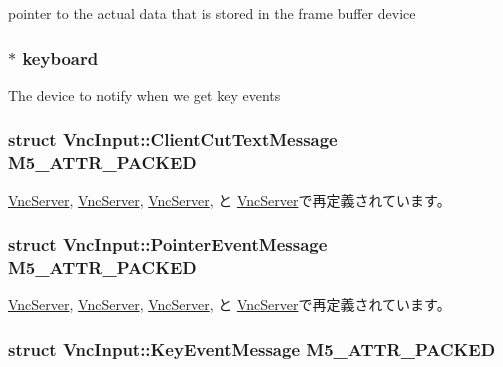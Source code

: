 pointer to the actual data that is stored in the frame buffer device \hypertarget{classVncInput_a185f1d765c763c2a2aae6b2b652a9032}{
\subsubsection[{keyboard}]{$\ast$ {\bf keyboard}}}
\label{classVncInput_a185f1d765c763c2a2aae6b2b652a9032}
The device to notify when we get key events \hypertarget{classVncInput_a7c02cfd94c82d02abac5f31f753a2865}{
\subsubsection[{M5\_\-ATTR\_\-PACKED}]{\setlength{\rightskip}{0pt plus 5cm}struct {\bf VncInput::ClientCutTextMessage}  {\bf M5\_\-ATTR\_\-PACKED}}}
\label{classVncInput_a7c02cfd94c82d02abac5f31f753a2865}


\hyperlink{group__VncConstants_ga2f0a8a1f1c40593e1e01ce4b8087d792}{VncServer}, \hyperlink{group__VncConstants_ga357314e013d6289c7d085fadd56a290c}{VncServer}, \hyperlink{group__VncConstants_gab34a91a8552f4b2f7e2806b835f39780}{VncServer}, と \hyperlink{group__VncConstants_gac782a3823c0bb07395a234047394d59e}{VncServer}で再定義されています。\hypertarget{classVncInput_aa0547849b66438129f69b5e83e4c5d01}{
\subsubsection[{M5\_\-ATTR\_\-PACKED}]{\setlength{\rightskip}{0pt plus 5cm}struct {\bf VncInput::PointerEventMessage}  {\bf M5\_\-ATTR\_\-PACKED}}}
\label{classVncInput_aa0547849b66438129f69b5e83e4c5d01}


\hyperlink{group__VncConstants_ga2f0a8a1f1c40593e1e01ce4b8087d792}{VncServer}, \hyperlink{group__VncConstants_ga357314e013d6289c7d085fadd56a290c}{VncServer}, \hyperlink{group__VncConstants_gab34a91a8552f4b2f7e2806b835f39780}{VncServer}, と \hyperlink{group__VncConstants_gac782a3823c0bb07395a234047394d59e}{VncServer}で再定義されています。\hypertarget{classVncInput_acf72f29fcbdb55be99efe15fd27ca8e8}{
\subsubsection[{M5\_\-ATTR\_\-PACKED}]{\setlength{\rightskip}{0pt plus 5cm}struct {\bf VncInput::KeyEventMessage}  {\bf M5\_\-ATTR\_\-PACKED}}}
\label{classVncInput_acf72f29fcbdb55be99efe15fd27ca8e8}


